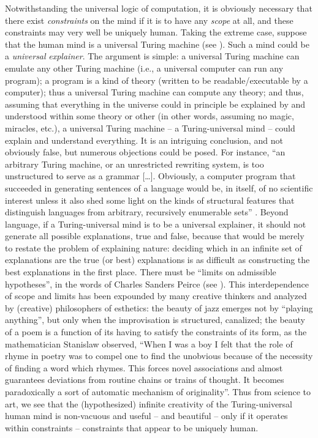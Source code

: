 \documentclass[output=paper]{langsci/langscibook}
\begin{document}
Notwithstanding the universal logic of computation, it is obviously
necessary that there exist \emph{constraints} on the mind if it is to have any
\emph{scope} at all, and these constraints may very well be uniquely human.
Taking the extreme case, suppose that the human mind is a universal Turing
machine (see \citealt{Watumull2015}). Such a mind could be a \emph{universal}
\emph{explainer}. The argument is simple: a universal Turing machine can
emulate any other Turing machine (i.e., a universal computer can run any
program); a program is a kind of theory (written to be readable/executable by a
computer); thus a universal Turing machine can compute any theory; and thus,
assuming that everything in the universe could in principle be explained by and
understood within some theory or other (in other words, assuming no magic,
miracles, etc.), a universal Turing machine -- a Turing-universal mind -- could
explain and understand everything. It is an intriguing conclusion, and not
obviously false, but numerous objections could be posed. For instance, “an
arbitrary Turing machine, or an unrestricted rewriting system, is too
unstructured to serve as a grammar […]. Obviously, a computer program that
succeeded in generating sentences of a language would be, in itself, of no
scientific interest unless it also shed some light on the kinds of structural
features that distinguish languages from arbitrary, recursively enumerable
sets” \citep[360]{Chomsky1963}. Beyond language, if a
Turing-universal mind is to be a universal explainer, it should not generate
all possible explanations, true and false, because that would be merely to
restate the problem of explaining nature: deciding which in an infinite set of
explanations are the true (or best) explanations is as difficult as
constructing the best explanations in the first place. There must be “limits on
admissible hypotheses”, in the words of Charles Sanders Peirce (see
\citealt{Chomsky2006}). This interdependence of scope and limits has been
expounded by many creative thinkers and analyzed by (creative) philosophers of
esthetics: the beauty of jazz emerges not by “playing anything”, but only when
the improvisation is structured, canalized; the beauty of a poem is a function
of its having to satisfy the constraints of its form, as the mathematician
Stanislaw \citet[180]{Ulam1976} observed, “When I was a boy I felt that the
role of rhyme in poetry was to compel one to find the unobvious because of the
necessity of finding a word which rhymes. This forces novel associations and
almost guarantees deviations from routine chains or trains of thought. It
becomes paradoxically a sort of automatic mechanism of originality”. Thus from
science to art, we see that the (hypothesized) infinite creativity of the
Turing-universal human mind is non-vacuous and useful -- and beautiful -- only if it
operates within constraints – constraints that appear to be uniquely human.
\end{document}
